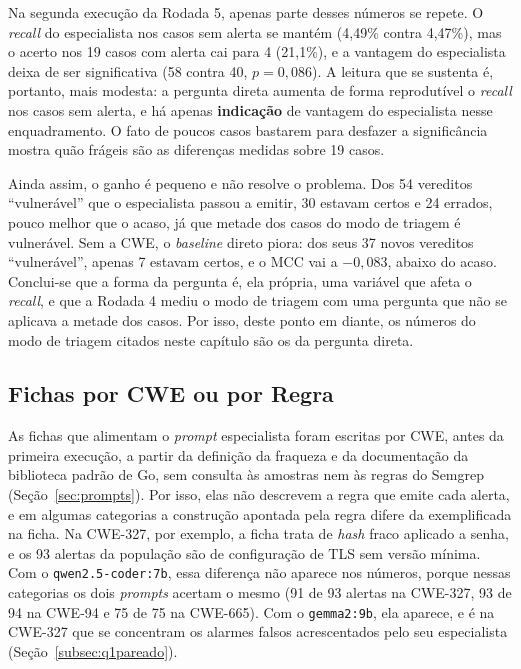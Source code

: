 Na segunda execução da Rodada 5, apenas parte desses números se repete. O \textit{recall} do especialista nos casos sem alerta se mantém (4,49\% contra 4,47\%), mas o acerto nos 19 casos com alerta cai para 4 (21,1\%), e a vantagem do especialista deixa de ser significativa (58 contra 40, $p = 0{,}086$). A leitura que se sustenta é, portanto, mais modesta: a pergunta direta aumenta de forma reprodutível o \textit{recall} nos casos sem alerta, e há apenas \textbf{indicação} de vantagem do especialista nesse enquadramento. O fato de poucos casos bastarem para desfazer a significância mostra quão frágeis são as diferenças medidas sobre 19 casos.

Ainda assim, o ganho é pequeno e não resolve o problema. Dos 54 vereditos ``vulnerável'' que o especialista passou a emitir, 30 estavam certos e 24 errados, pouco melhor que o acaso, já que metade dos casos do modo de triagem é vulnerável. Sem a CWE, o \textit{baseline} direto piora: dos seus 37 novos vereditos ``vulnerável'', apenas 7 estavam certos, e o MCC vai a $-0{,}083$, abaixo do acaso. Conclui-se que a forma da pergunta é, ela própria, uma variável que afeta o \textit{recall}, e que a Rodada 4 mediu o modo de triagem com uma pergunta que não se aplicava a metade dos casos. Por isso, deste ponto em diante, os números do modo de triagem citados neste capítulo são os da pergunta direta.

\subsection{Fichas por CWE ou por Regra}
\label{subsec:q1fichas}

As fichas que alimentam o \textit{prompt} especialista foram escritas por CWE, antes da primeira execução, a partir da definição da fraqueza e da documentação da biblioteca padrão de Go, sem consulta às amostras nem às regras do Semgrep (Seção~\ref{sec:prompts}). Por isso, elas não descrevem a regra que emite cada alerta, e em algumas categorias a construção apontada pela regra difere da exemplificada na ficha. Na CWE-327, por exemplo, a ficha trata de \textit{hash} fraco aplicado a senha, e os 93 alertas da população são de configuração de TLS sem versão mínima. Com o \texttt{qwen2.5-coder:7b}, essa diferença não aparece nos números, porque nessas categorias os dois \textit{prompts} acertam o mesmo (91 de 93 alertas na CWE-327, 93 de 94 na CWE-94 e 75 de 75 na CWE-665). Com o \texttt{gemma2:9b}, ela aparece, e é na CWE-327 que se concentram os alarmes falsos acrescentados pelo seu especialista (Seção~\ref{subsec:q1pareado}).

